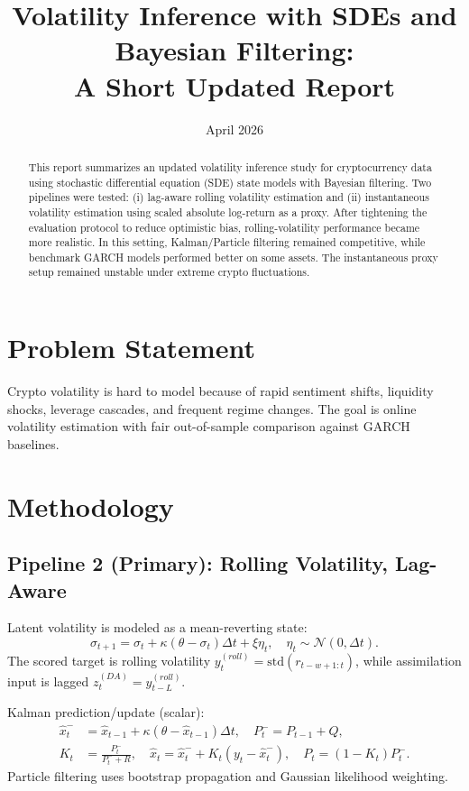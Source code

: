 \documentclass[10pt]{article}
\title{Volatility Inference with SDEs and Bayesian Filtering:\\
A Short Updated Report}
\author{}
\date{April 2026}
\begin{document}
\maketitle

\begin{abstract}
This report summarizes an updated volatility inference study for cryptocurrency data using stochastic differential equation (SDE) state models with Bayesian filtering. Two pipelines were tested: (i) lag-aware rolling volatility estimation and (ii) instantaneous volatility estimation using scaled absolute log-return as a proxy. After tightening the evaluation protocol to reduce optimistic bias, rolling-volatility performance became more realistic. In this setting, Kalman/Particle filtering remained competitive, while benchmark GARCH models performed better on some assets. The instantaneous proxy setup remained unstable under extreme crypto fluctuations.
\end{abstract}

\section{Problem Statement}
Crypto volatility is hard to model because of rapid sentiment shifts, liquidity shocks, leverage cascades, and frequent regime changes. The goal is online volatility estimation with fair out-of-sample comparison against GARCH baselines.

\section{Methodology}
\subsection{Pipeline 2 (Primary): Rolling Volatility, Lag-Aware}
Latent volatility is modeled as a mean-reverting state:
\begin{equation}
\sigma_{t+1}=\sigma_t+\kappa(\theta-\sigma_t)\Delta t+\xi\eta_t,\quad \eta_t\sim\mathcal{N}(0,\Delta t).
\end{equation}
The scored target is rolling volatility $y_t^{(roll)}=\mathrm{std}(r_{t-w+1:t})$, while assimilation input is lagged $z_t^{(DA)}=y_{t-L}^{(roll)}$.

Kalman prediction/update (scalar):
\begin{align}
\hat x_t^- &= \hat x_{t-1}+\kappa(\theta-\hat x_{t-1})\Delta t,\quad P_t^- = P_{t-1}+Q,\\
K_t &= \frac{P_t^-}{P_t^-+R},\quad \hat x_t=\hat x_t^-+K_t(y_t-\hat x_t^-),\quad P_t=(1-K_t)P_t^-.
\end{align}
Particle filtering uses bootstrap propagation and Gaussian likelihood weighting.
\end{document}
